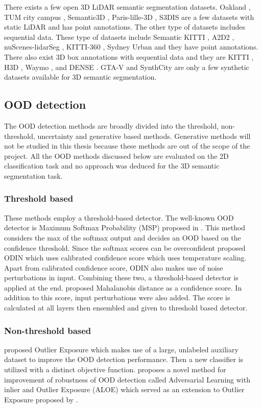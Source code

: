 \documentclass[thesis]{mas_proposal}
\begin{document}
There exists a few open 3D LiDAR semantic segmentation datasets. 
Oakland \cite{oakland}, TUM city campus \cite{gehrung2017approach_tum_campus}, Semantic3D \cite{hackel2017semantic3d}, Paris-lille-3D \cite{roynard2018paris}, S3DIS \cite{Armeni_2016_CVPR_S3DIS} are a few datasets with static LiDAR and has point annotations.
The other type of datasets includes sequential data.
These type of datasets include Semantic KITTI \cite{Behley_2019_ICCV}, A2D2 \cite{geyer2020a2d2}, nuScenes-lidarSeg \cite{caesar2020nuscenes}, KITTI-360 \cite{Xie_2016_CVPR_KITTI_360}, Sydney Urban \cite{de2013unsupervised} and they have point annotations.
There also exist 3D box annotations with sequential data and they are KITTI \cite{KITTI}, H3D \cite{H3D}, Waymo \cite{Sun_2020_CVPR_Waymo}, and DENSE \cite{Bijelic_2020_CVPR_DENSE}.
GTA-V \cite{GTAV} and SynthCity \cite{griffiths2019synthcity} are only a few synthetic datasets available for 3D semantic segmentation.

\subsection{OOD detection}
The OOD detection methods are broadly divided into the threshold, non-threshold, uncertainty and generative based methods.
Generative methods will not be studied in this thesis because these methods are out of the scope of the project.
All the OOD methods discussed below are evaluated on the 2D classification task and no approach was deduced for the 3D semantic segmentation task.
\subsubsection{Threshold based}
These methods employ a threshold-based detector.
The well-known OOD detector is Maximum Softmax Probability (MSP) proposed in \cite{hendrycks2016baseline_MSP}. 
This method considers the max of the softmax output and decides an OOD based on the confidence threshold.
Since the softmax scores can be overconfident \cite{liang2017enhancing_ODIN} proposed ODIN which uses calibrated confidence score which uses temperature scaling.
Apart from calibrated confidence score, ODIN also makes use of noise perturbations in input.
Combining these two, a threshold-based detector is applied at the end. 
\cite{lee2018simple_mahalanobis} proposed Mahalanobis distance as a confidence score. 
In addition to this score, input perturbations were also added. 
The score is calculated at all layers then ensembled and given to threshold based detector.
\subsubsection{Non-threshold based}
\cite{hendrycks2018deep_OE} proposed Outlier Exposure which makes use of a large, unlabeled auxiliary dataset to improve the OOD detection performance. 
Then a new classifier is utilized with a distinct objective function. 
\cite{chen2020robust} proposes a novel method for improvement of robustness of OOD detection called Adversarial Learning with inlier and Outlier Exposure (ALOE) which served as an extension to Outlier Exposure proposed by \cite{hendrycks2018deep_OE}.
\end{document}
